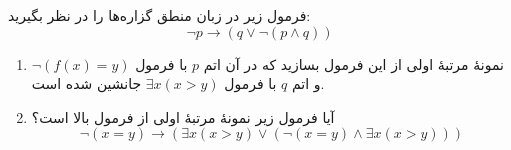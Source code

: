 فرمول زیر در زبان منطق گزاره‌ها را در نظر بگیرید:
\[\neg p \rightarrow (q \vee \neg(p \wedge q))\]
\begin{enumerate}[label=(\alph*)]
  \item نمونه‌ٔ مرتبهٔ اولی از این فرمول بسازید که در آن اتم $p$ با فرمول $\neg(f(x)=y)$ و اتم $q$ با فرمول $\exists x (x > y)$ جانشین شده است.
  \item آیا فرمول زیر نمونهٔ مرتبهٔ اولی از فرمول بالا است؟
  \[ \neg(x = y) \rightarrow (\exists x (x > y) \vee (\neg(x = y) \wedge \exists x (x > y))) \]
\end{enumerate}